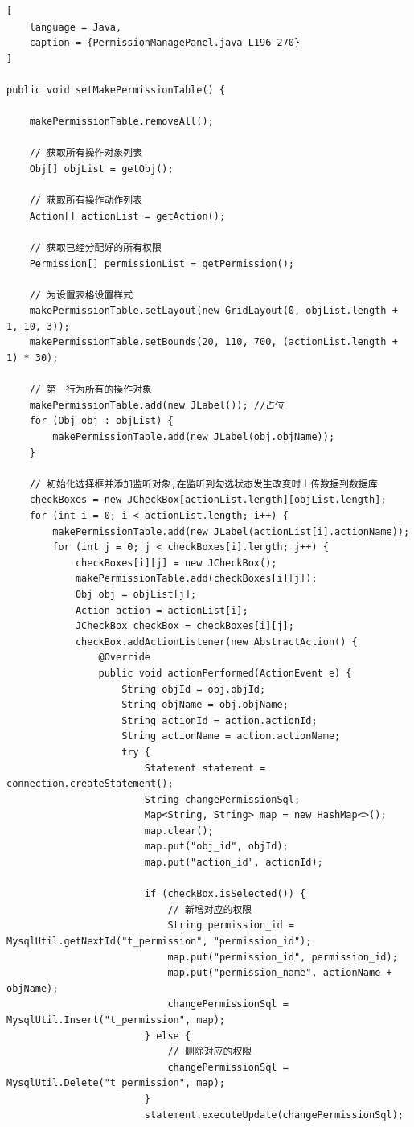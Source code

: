 \documentclass[12pt, a4paper, oneside]{ctexart}
\begin{document}
\begin{lstlisting}[
    language = Java,
    caption = {PermissionManagePanel.java L196-270}
]

public void setMakePermissionTable() {

    makePermissionTable.removeAll();

    // 获取所有操作对象列表
    Obj[] objList = getObj();

    // 获取所有操作动作列表
    Action[] actionList = getAction();

    // 获取已经分配好的所有权限
    Permission[] permissionList = getPermission();

    // 为设置表格设置样式
    makePermissionTable.setLayout(new GridLayout(0, objList.length + 1, 10, 3));
    makePermissionTable.setBounds(20, 110, 700, (actionList.length + 1) * 30);

    // 第一行为所有的操作对象
    makePermissionTable.add(new JLabel()); //占位
    for (Obj obj : objList) {
        makePermissionTable.add(new JLabel(obj.objName));
    }

    // 初始化选择框并添加监听对象,在监听到勾选状态发生改变时上传数据到数据库
    checkBoxes = new JCheckBox[actionList.length][objList.length];
    for (int i = 0; i < actionList.length; i++) {
        makePermissionTable.add(new JLabel(actionList[i].actionName));
        for (int j = 0; j < checkBoxes[i].length; j++) {
            checkBoxes[i][j] = new JCheckBox();
            makePermissionTable.add(checkBoxes[i][j]);
            Obj obj = objList[j];
            Action action = actionList[i];
            JCheckBox checkBox = checkBoxes[i][j];
            checkBox.addActionListener(new AbstractAction() {
                @Override
                public void actionPerformed(ActionEvent e) {
                    String objId = obj.objId;
                    String objName = obj.objName;
                    String actionId = action.actionId;
                    String actionName = action.actionName;
                    try {
                        Statement statement = connection.createStatement();
                        String changePermissionSql;
                        Map<String, String> map = new HashMap<>();
                        map.clear();
                        map.put("obj_id", objId);
                        map.put("action_id", actionId);

                        if (checkBox.isSelected()) {
                            // 新增对应的权限
                            String permission_id = MysqlUtil.getNextId("t_permission", "permission_id");
                            map.put("permission_id", permission_id);
                            map.put("permission_name", actionName + objName);
                            changePermissionSql = MysqlUtil.Insert("t_permission", map);
                        } else {
                            // 删除对应的权限
                            changePermissionSql = MysqlUtil.Delete("t_permission", map);
                        }
                        statement.executeUpdate(changePermissionSql);


\end{lstlisting}
\end{document}
